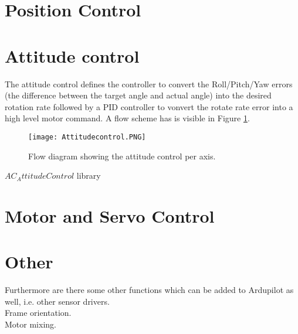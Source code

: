 \section{Position Control}




\section{Attitude control}
The attitude control defines the controller to convert the Roll/Pitch/Yaw errors (the difference between the target angle and actual angle) into the desired rotation rate followed by a PID controller to vonvert the rotate rate error into a high level motor command. A flow scheme has is visible in Figure \ref{fig:attitudecontrol}.

\begin{figure}[H]
\centering
\texttt{[image: Attitudecontrol.PNG]}
\caption{Flow diagram showing the attitude control per axis.}
\label{fig:attitudecontrol}
\end{figure}

$AC_AttitudeControl$ library

\section{Motor and Servo Control} 


\section{Other}
Furthermore are there some other functions which can be added to Ardupilot as well, i.e. other sensor drivers.\\
Frame orientation. \\
Motor mixing.\\

